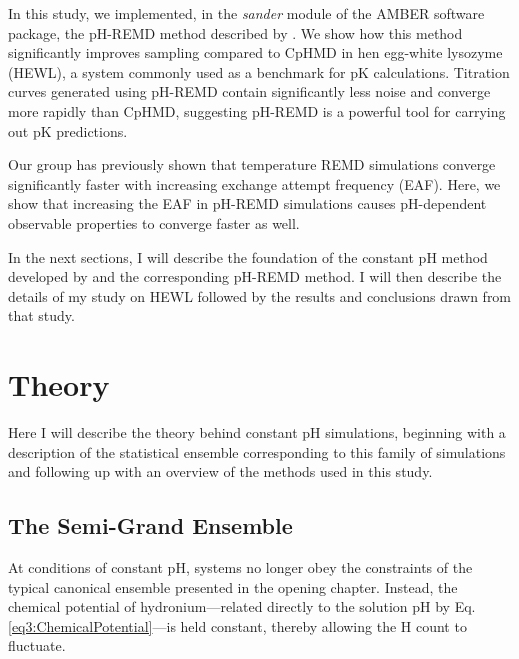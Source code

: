 In this study, we implemented, in the \emph{sander} module of the AMBER
\cite{AMBER12} software package, the pH-REMD method described by
\citeauthor{Itoh_Proteins_2011_v79_p3420} \cite{Itoh_Proteins_2011_v79_p3420}.
We show how this method significantly improves sampling compared to CpHMD in hen
egg-white lysozyme (HEWL), a system commonly used as a benchmark for pK
calculations. Titration curves generated using pH-REMD contain significantly
less noise and converge more rapidly than CpHMD, suggesting pH-REMD is a
powerful tool for carrying out pK predictions.

Our group has previously shown that temperature REMD simulations converge
significantly faster with increasing exchange attempt frequency (EAF).
\cite{Sindhikara2008,Sindhikara2010} Here, we show that increasing the EAF in
pH-REMD simulations causes pH-dependent observable properties to converge faster
as well.

In the next sections, I will describe the foundation of the constant pH method
developed by \citeauthor{Mongan_JComputChem_2004_v25_p2038}
\cite{Mongan_JComputChem_2004_v25_p2038} and the corresponding pH-REMD method.
\cite{Itoh_Proteins_2011_v79_p3420, Wallace_JChemTheoryComput_2011_v7_p2617} I
will then describe the details of my study on HEWL followed by the results and
conclusions drawn from that study.

\section{Theory}

Here I will describe the theory behind constant pH simulations, beginning with a
description of the statistical ensemble corresponding to this family of
simulations and following up with an overview of the methods used in this study.

\subsection{The Semi-Grand Ensemble}

At conditions of constant pH, systems no longer obey the constraints of the
typical canonical ensemble presented in the opening chapter. Instead, the
chemical potential of hydronium---related directly to the solution pH by Eq.
\ref{eq3:ChemicalPotential}---is held constant, thereby allowing the H\super{+}
count to fluctuate.


